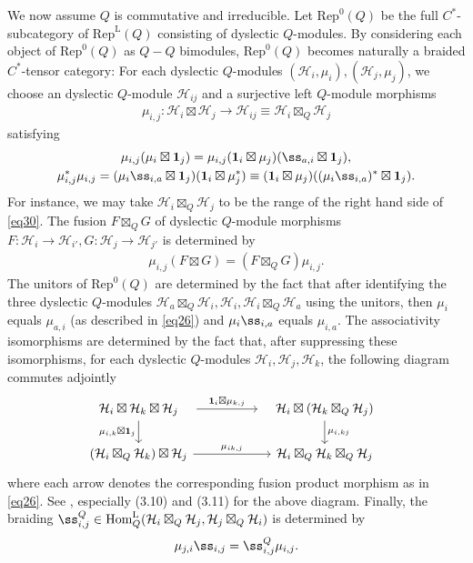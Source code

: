 \documentclass[12pt,a4paper,notitlepage]{article}
\theoremstyle{definition}
\theoremstyle{plain}
\newcommand{\mc}{\mathcal}
\newcommand{\id}{\mathbf{1}}
\newcommand{\Rep}{\mathrm{Rep}}
\newcommand{\RepL}{\mathrm{Rep}^{\mathrm{L}}}
\newcommand{\HomL}{\mathrm{Hom}^{\mathrm{L}}}
\numberwithin{equation}{section}
\begin{document}
We now assume $Q$ is commutative and irreducible. Let $\Rep^0(Q)$ be the full $C^*$-subcategory of $\RepL(Q)$ consisting of  dyslectic $Q$-modules. By considering each object of $\Rep^0(Q)$ as $Q-Q$ bimodules, $\Rep^0(Q)$ becomes naturally a braided $C^*$-tensor category: For each dyslectic $Q$-modules $(\mc H_i,\mu_i),(\mc H_j,\mu_j)$, we choose an dyslectic $Q$-module $\mc H_{ij}$ and a surjective left $Q$-module morphisms 
\begin{align}
\mu_{i,j}: \mc H_i\boxtimes\mc H_j\rightarrow \mc H_{ij}\equiv\mc H_i\boxtimes_Q\mc H_j	\label{eq26}
\end{align}
satisfying 
\begin{gather}
\mu_{i,j}(\mu_i\boxtimes\id_j)=\mu_{i,j}(\id_i\boxtimes\mu_j)(\ss_{a,i}\boxtimes\id_j),\label{eq29}\\
\mu_{i,j}^*\mu_{i,j}=(\mu_i\ss_{i,a}\boxtimes\id_j)(\id_i\boxtimes\mu_j^*)\equiv(\id_i\boxtimes\mu_j)((\mu_i\ss_{i,a})^*\boxtimes\id_j).\label{eq30}
\end{gather}
For instance, we may  take $\mc H_i\boxtimes_Q\mc H_j$ to be the range of the right hand side of \eqref{eq30}. The fusion $F\boxtimes_Q G$ of dyslectic $Q$-module morphisms  $F:\mc H_i\rightarrow\mc H_{i'},G:\mc H_j\rightarrow\mc H_{j'}$ is determined by
\begin{align}
\mu_{i,j}(F\boxtimes G)=(F\boxtimes_Q G)\mu_{i,j}.	
\end{align}
The unitors of $\Rep^0(Q)$ are determined by the fact that after identifying the three dyslectic $Q$-modules $\mc H_a\boxtimes_Q \mc H_i,\mc H_i,\mc H_i\boxtimes_Q\mc H_a$ using the unitors, then $\mu_i$ equals $\mu_{a,i}$ (as described in \eqref{eq26}) and $\mu_i\ss_{i,a}$ equals $\mu_{i,a}$. The associativity isomorphisms are determined by the fact that, after suppressing these isomorphisms, for each dyslectic $Q$-modules $\mc H_i,\mc H_j,\mc H_k$, the following diagram commutes adjointly
\begin{equation}
	\begin{tikzcd}
		\quad \mc H_i\boxtimes\mc H_k\boxtimes\mc H_j\quad \arrow[rr,"{\id_i\boxtimes\mu_{k,j}}"] \arrow[d, "{\mu_{i,k}\boxtimes\id_j}"'] &&\quad \mc H_i\boxtimes(\mc H_k\boxtimes_Q\mc H_j)\quad \arrow[d, "{\mu_{i,kj}}"]\\
		(\mc H_i\boxtimes_Q\mc H_k)\boxtimes\mc H_j\arrow[rr,"{\mu_{ik,j}}"] &&\mc H_i\boxtimes_Q\mc H_k\boxtimes_Q\mc H_j
	\end{tikzcd}
\end{equation}
where each arrow denotes the corresponding fusion product morphism as in \eqref{eq26}. See \cite[Sec. 3.2, 3.4]{Gui19}, especially (3.10) and (3.11) for the above diagram. Finally, the braiding $\ss_{i,j}^Q\in\HomL_Q(\mc H_i\boxtimes_Q\mc H_j,\mc H_j\boxtimes_Q\mc H_i)$ is determined by
\begin{align}
\mu_{j,i}\ss_{i,j}=\ss^Q_{i,j}\mu_{i,j}.	
\end{align} 
\end{document}
